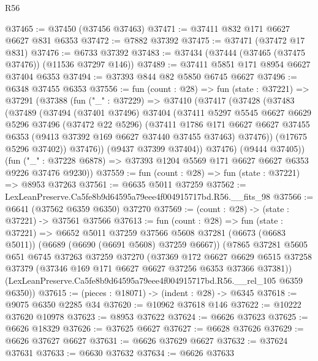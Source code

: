 \begin{lexlean}{R56}
\begin{coremodule}
@37465 := @37450 (@37456 @37463)
@37471 := @37411 @832 @171 @6627 @6627 @831 @6353
@37472 := @7882 @37392
@37475 := @37471 (@37472 @17 @831)
@37476 := @6733 @37392
@37483 := @37434 (@37444 (@37465 (@37475 @37476)) (@11536 @37297 @146))
@37489 := @37411 @5851 @171 @8954 @6627 @37404 @6353
@37494 := @37393 @844 @82 @5850 @6745 @6627
@37496 := @6348 @37455 @6353
@37556 := fun (count : @28) =>
  fun (state : @37221) =>
  @37291
    (@37388
      (fun ("_" : @37229) =>
      @37410
        (@37417
          (@37428
            (@37483
              (@37489
                (@37494
                  (@37401 @37496)
                  @37404
                  (@37411
                    @5297
                    @5545
                    @6627
                    @6629
                    @5296
                    @37496
                    (@37472 @22 @5296)
                    (@37411
                      @1786
                      @171
                      @6627
                      @6627
                      @37455
                      @6353
                      (@9413 @37392 @169 @6627 @37440 @37455 @37463)
                      @37476))
                  (@17675 @5296 @37402))
                @37476))
            (@9437 @37399 @37404))
          @37476)
        (@9444 @37405))
      (fun ("_" : @37228 @6878) => @37393 @1204 @5569 @171 @6627 @6627 @6353 @9226 @37476 @9230))
@37559 := fun (count : @28) => fun (state : @37221) => @8953 @37263
@37561 := @6635 @5011 @37259
@37562 := LexLeanPreserve.Ca5fe8b9d64595a79eee4f004915717bd.R56.__fits_98
@37566 := @6641 (@37562 @6359 @6350) @37270
@37569 := (count : @28) -> (state : @37221) -> @37561 @37566
@37613 := fun (count : @28) =>
  fun (state : @37221) =>
  @6652
    @5011
    @37259
    @37566
    @5608
    @37281
    (@6673 (@6683 @5011))
    (@6689 (@6690 (@6691 @5608) @37259 @6667))
    (@7865
      @37281
      @5605
      @651
      @6745
      @37263
      @37259
      @37270
      (@37369
        @172
        @6627
        @6629
        @6515
        @37258
        @37379
        (@37346 @169 @171 @6627 @6627 @37256 @6353 @37366 @37381))
      (LexLeanPreserve.Ca5fe8b9d64595a79eee4f004915717bd.R56.__rel_105 @6359 @6350))
@37615 := (pieces : @18071) -> (indent : @28) -> @6345
@37618 := @9075 @6350 @2285 @34
@37620 := @10962 @37618 @146
@37622 := @10222 @37620 @10978
@37623 := @8953 @37622
@37624 := @6626 @37623
@37625 := @6626 @18329
@37626 := @37625 @6627
@37627 := @6628 @37626
@37629 := @6626 @37627 @6627
@37631 := @6626 @37629 @6627
@37632 := @37624 @37631
@37633 := @6630 @37632
@37634 := @6626 @37633

\end{coremodule}
\end{lexlean}
